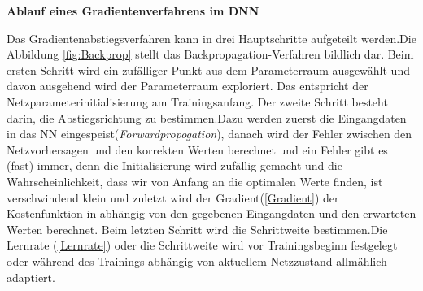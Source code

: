 \documentclass[12pt,a4paper]{scrartcl}
\numberwithin{equation}{section}
\begin{document}
\begin{center}
	\textbf{Ablauf eines Gradientenverfahrens im \ac{DNN} }
\end{center}
Das Gradientenabstiegsverfahren kann in drei Hauptschritte aufgeteilt werden.Die Abbildung \ref{fig:Backprop} stellt das Backpropagation-Verfahren bildlich dar.
Beim ersten Schritt  wird ein zufälliger Punkt aus dem Parameterraum ausgewählt und davon ausgehend wird der Parameterraum exploriert. Das entspricht der Netzparameterinitialisierung am Trainingsanfang.
Der zweite Schritt besteht darin, die Abstiegsrichtung zu bestimmen.Dazu werden zuerst die Eingangdaten in das \ac{NN} eingespeist(\textit{Forwardpropogation}), danach wird der Fehler zwischen den Netzvorhersagen und den korrekten Werten berechnet und ein Fehler gibt es (fast) immer, denn die Initialisierung wird zufällig gemacht und die Wahrscheinlichkeit, dass wir von Anfang an die optimalen Werte finden, ist verschwindend klein und zuletzt wird der Gradient(\ref{Gradient}) der Kostenfunktion in abhängig von den gegebenen Eingangdaten und den erwarteten Werten berechnet. 
Beim letzten Schritt wird die Schrittweite bestimmen.Die Lernrate (\ref{Lernrate}) oder die Schrittweite wird vor Trainingsbeginn festgelegt oder während des Trainings abhängig von aktuellem Netzzustand allmählich adaptiert.
\end{document}

